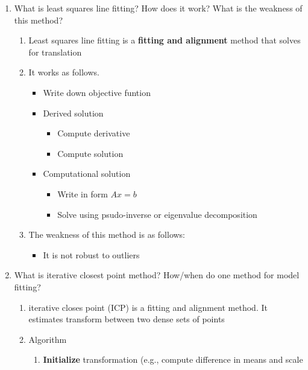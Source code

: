 \documentclass[12pt,letterpaper]{article}
\begin{document}
\begin{enumerate}
\begin{itemize}
    \end{itemize}
    \color{black}
    \item What is least squares line fitting? How does it work? What is the weakness of this method?\\
    \color{red}
    \begin{enumerate}
        \item Least squares line fitting is a \textbf{fitting and alignment} method that solves for translation
        \item It works as follows. 
        \begin{itemize}
            \item Write down objective funtion 
            \item Derived solution 
            \begin{itemize}
                \item Compute derivative 
                \item Compute solution 
            \end{itemize}
            \item Computational solution 
            \begin{itemize}
                \item Write in form $Ax = b$
                \item Solve using psudo-inverse or eigenvalue decomposition
            \end{itemize}
        \end{itemize}
        \item The weakness of this method is as follows: 
        \begin{itemize}
            \item It is not robust to outliers
        \end{itemize}
    \end{enumerate}
    \color{black}
    \item What is iterative closest point method? How/when do one method for model fitting?\\
    \color{red}
    \begin{enumerate}
        \item iterative closes point (ICP) is a fitting and alignment method.  It estimates transform between two dense sets of points
        \item Algorithm 
        \begin{enumerate}
            \item \textbf{Initialize} transformation (e.g., compute difference in means and scale

\end{enumerate}
\end{enumerate}
\end{enumerate}
\end{document}
